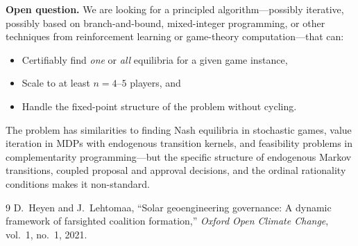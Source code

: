 \documentclass[11pt]{article}
\begin{document}
\medskip

\noindent\textbf{Open question.} We are looking for a principled algorithm---possibly iterative,
possibly based on branch-and-bound, mixed-integer programming, or other techniques from
reinforcement learning or game-theory computation---that can:
\begin{itemize}
  \item Certifiably find \emph{one} or \emph{all} equilibria for a given game instance,
  \item Scale to at least $n = 4$--$5$ players, and
  \item Handle the fixed-point structure of the problem without cycling.
\end{itemize}
The problem has similarities to finding Nash equilibria in stochastic games, value iteration in
MDPs with endogenous transition kernels, and feasibility problems in complementarity
programming---but the specific structure of endogenous Markov transitions, coupled proposal and
approval decisions, and the ordinal rationality conditions makes it non-standard.

\begin{thebibliography}{9}
  D.~Heyen and J.~Lehtomaa,
  ``Solar geoengineering governance: A dynamic framework of farsighted coalition formation,''
  \emph{Oxford Open Climate Change}, vol.~1, no.~1, 2021.
\end{thebibliography}
\end{document}
